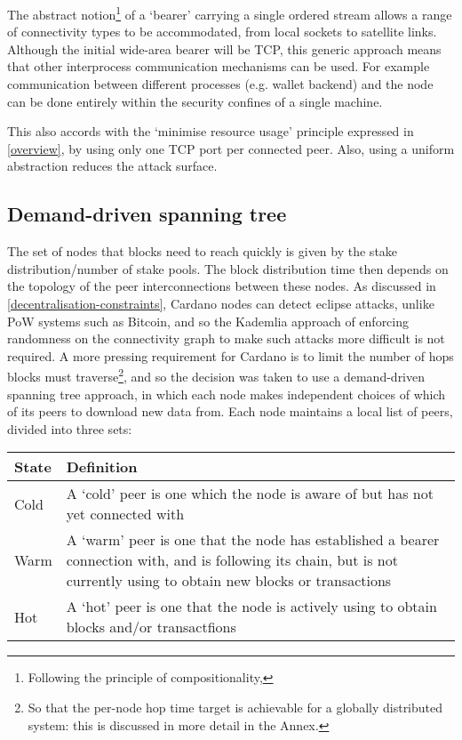 \documentclass[11pt,a4paper]{article}
\begin{document}
The abstract notion\footnote{Following the principle of
  compositionality,} of a `bearer' carrying a single ordered stream
allows a range of connectivity types to be accommodated, from local
sockets to satellite links. Although the initial wide-area bearer will
be TCP, this generic approach means that other interprocess
communication mechanisms can be used. For example communication between
different processes (e.g. wallet backend) and the node can be done
entirely within the security confines of a single machine.

This also accords with the `minimise resource usage' principle expressed
in \cref{overview}, by using only one TCP port per connected peer. Also,
using a uniform abstraction reduces the attack surface.

\subsection{Demand-driven spanning tree}
\label{demand-driven-spanning-tree}

The set of nodes that blocks need to reach quickly is given by the stake
distribution/number of stake pools. The block distribution time then
depends on the topology of the peer interconnections between these
nodes. As discussed in
\cref{decentralisation-constraints}, Cardano nodes
can detect eclipse attacks, unlike PoW systems such as Bitcoin, and so
the Kademlia approach of enforcing randomness on the connectivity graph
to make such attacks more difficult is not required. A more pressing
requirement for Cardano is to limit the number of hops blocks must
traverse\footnote{So that the per-node hop time target is achievable for
  a globally distributed system: this is discussed in more detail in the
  Annex.}, and so the decision was taken to use a demand-driven spanning
tree approach, in which each node makes independent choices of which of
its peers to download new data from. Each node maintains a local list of
peers, divided into three sets:

\begin{longtable}[]{lp{10cm}}
\toprule
  \textbf{State} & {\textbf{Definition}}\tabularnewline
\midrule
\endhead
  Cold & A `cold' peer is one which the node is aware of but has not yet
  connected with\tabularnewline
  Warm & A `warm' peer is one that the node has established a bearer
  connection with, and is following its chain, but is not currently using
  to obtain new blocks or transactions\tabularnewline
  Hot & A `hot' peer is one that the node is actively using to obtain
  blocks and/or transactfions\tabularnewline
\bottomrule
\end{longtable}
\end{document}

